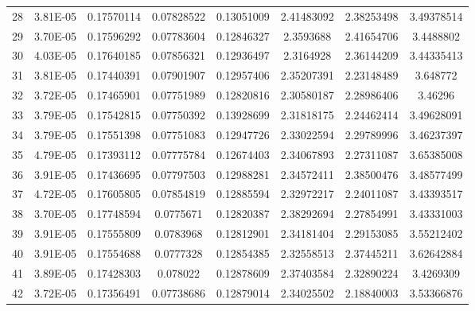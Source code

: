 \documentclass[11pt]{scrartcl}
\theoremstyle{dotlessP}
\theoremstyle{dotlessN}
\theoremstyle{dotN}
\begin{document}
\begin{table}[H]
{\begin{tabular}{c|c|c|c|c|c|c|c}
28    & 3.81E-05  & 0.17570114      & 0.07828522    & 0.13051009          & 2.41483092         & 2.38253498       & 3.49378514             \\
29    & 3.70E-05  & 0.17596292      & 0.07783604    & 0.12846327          & 2.3593688          & 2.41654706       & 3.4488802              \\
30    & 4.03E-05  & 0.17640185      & 0.07856321    & 0.12936497          & 2.3164928          & 2.36144209       & 3.44335413             \\
31    & 3.81E-05  & 0.17440391      & 0.07901907    & 0.12957406          & 2.35207391         & 2.23148489       & 3.648772               \\
32    & 3.72E-05  & 0.17465901      & 0.07751989    & 0.12820816          & 2.30580187         & 2.28986406       & 3.46296                \\
33    & 3.79E-05  & 0.17542815      & 0.07750392    & 0.13928699          & 2.31818175         & 2.24462414       & 3.49628091             \\
34    & 3.79E-05  & 0.17551398      & 0.07751083    & 0.12947726          & 2.33022594         & 2.29789996       & 3.46237397             \\
35    & 4.79E-05  & 0.17393112      & 0.07775784    & 0.12674403          & 2.34067893         & 2.27311087       & 3.65385008             \\
36    & 3.91E-05  & 0.17436695      & 0.07797503    & 0.12988281          & 2.34572411         & 2.38500476       & 3.48577499             \\
37    & 4.72E-05  & 0.17605805      & 0.07854819    & 0.12885594          & 2.32972217         & 2.24011087       & 3.43393517             \\
38    & 3.70E-05  & 0.17748594      & 0.0775671     & 0.12820387          & 2.38292694         & 2.27854991       & 3.43331003             \\
39    & 3.91E-05  & 0.17555809      & 0.0783968     & 0.12812901          & 2.34181404         & 2.29153085       & 3.55212402             \\
40    & 3.91E-05  & 0.17554688      & 0.0777328     & 0.12854385          & 2.32558513         & 2.37445211       & 3.62642884             \\
41    & 3.89E-05  & 0.17428303      & 0.078022      & 0.12878609          & 2.37403584         & 2.32890224       & 3.4269309              \\
42    & 3.72E-05  & 0.17356491      & 0.07738686    & 0.12879014          & 2.34025502         & 2.18840003       & 3.53366876             \\

\end{tabular}}
\end{table}
\end{document}
